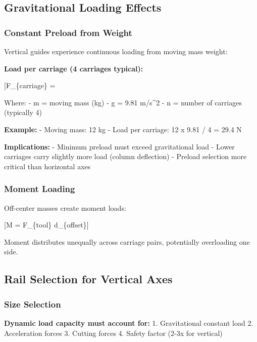 \documentclass[
]{article}
\begin{document}
\subsection{Gravitational Loading
Effects}\label{gravitational-loading-effects}

\subsubsection{Constant Preload from
Weight}\label{constant-preload-from-weight}

Vertical guides experience continuous loading from moving mass weight:

\textbf{Load per carriage (4 carriages typical):}

{[}F\_\{carriage\} = \frac{m \times g}{n}{]}

Where: - m = moving mass (kg) - g = 9.81 m/s\^{}2 - n = number of
carriages (typically 4)

\textbf{Example:} - Moving mass: 12 kg - Load per carriage: 12 x 9.81 /
4 = 29.4 N

\textbf{Implications:} - Minimum preload must exceed gravitational load
- Lower carriages carry slightly more load (column deflection) - Preload
selection more critical than horizontal axes

\subsubsection{Moment Loading}\label{moment-loading}

Off-center masses create moment loads:

{[}M = F\_\{tool\} \times d\_\{offset\}{]}

Moment distributes unequally across carriage pairs, potentially
overloading one side.

\subsection{Rail Selection for Vertical
Axes}\label{rail-selection-for-vertical-axes}

\subsubsection{Size Selection}\label{size-selection}

\textbf{Dynamic load capacity must account for:} 1. Gravitational
constant load 2. Acceleration forces 3. Cutting forces 4. Safety factor
(2-3x for vertical)
\end{document}
